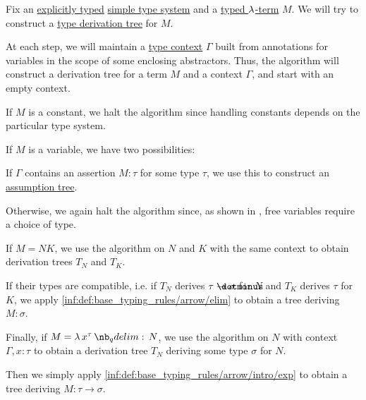 \begin{algorithm}\label{alg:typed_term_type_derivation}
  Fix an \hyperref[def:simple_type_system_style]{explicitly typed} \hyperref[def:simple_type_system]{simple type system} and a \hyperref[def:typed_lambda_term]{typed \( \mathrm{\lambda} \)-term} \( M \). We will try to construct a \hyperref[def:type_derivation_tree]{type derivation tree} for \( M \).

  At each step, we will maintain a \hyperref[def:type_context]{type context} \( \Gamma \) built from annotations for variables in the scope of some enclosing abstractors. Thus, the algorithm will construct a derivation tree for a term \( M \) and a context \( \Gamma \), and start with an empty context.

  \begin{thmenum}
     If \( M \) is a constant, we halt the algorithm since handling constants depends on the particular type system.

     If \( M \) is a variable, we have two possibilities:
    \begin{thmenum}
       If \( \Gamma \) contains an assertion \( M: \tau \) for some type \( \tau \), we use this to construct an \hyperref[def:type_derivation_tree/assumption]{assumption tree}.

       Otherwise, we again halt the algorithm since, as shown in , free variables require a choice of type.
    \end{thmenum}

     If \( M = NK \), we use the algorithm on \( N \) and \( K \) with the same context to obtain derivation trees \( T_N \) and \( T_K \).

    If their types are compatible, i.e. if \( T_N \) derives \( \tau \synimplies \sigma \) for \( N \) and \( T_K \) derives \( \tau \) for \( K \), we apply \ref{inf:def:base_typing_rules/arrow/elim} to obtain a tree deriving \( M: \sigma \).

     Finally, if \( M = \qabs {x^\tau} N \), we use the algorithm on \( N \) with context \( \Gamma, x: \tau \) to obtain a derivation tree \( T_N \) deriving some type \( \sigma \) for \( N \).

    Then we simply apply \ref{inf:def:base_typing_rules/arrow/intro/exp} to obtain a tree deriving \( M: \tau \to \sigma \).
  \end{thmenum}
\end{algorithm}
